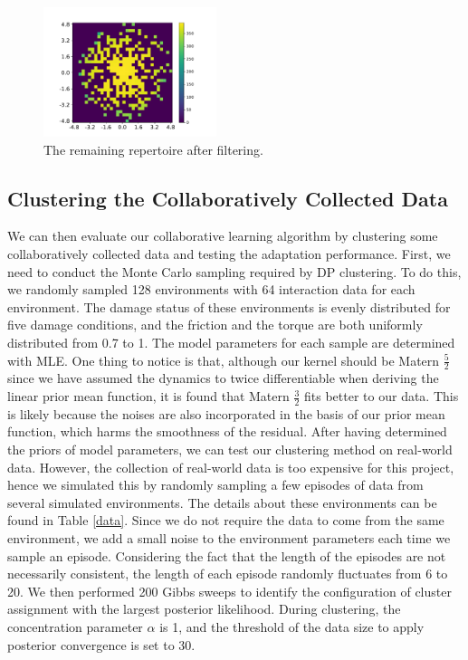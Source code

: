 \begin{figure}[h]
\centering
\includegraphics[width=0.45\textwidth]{filtered_map_elites.pdf}
\caption{The remaining repertoire after filtering.
}
\label{filtered_repertoire}
\end{figure}







\subsection{Clustering the Collaboratively Collected Data}
We can then evaluate our collaborative learning algorithm by clustering some collaboratively collected data and testing the adaptation performance. 
First, we need to conduct the Monte Carlo sampling required by DP clustering.
To do this, we randomly sampled 128 environments with 64 interaction data for each environment.
The damage status of these environments is evenly distributed for five damage conditions, and the friction and the torque are both uniformly distributed from 0.7 to 1.
The model parameters for each sample are determined with MLE.
One thing to notice is that, although our kernel should be Matern $\frac{5}{2}$ since we have assumed the dynamics to twice differentiable when deriving the linear prior mean function, it is found that Matern $\frac{3}{2}$ fits better to our data.
This is likely because the noises are also incorporated in the basis of our prior mean function, which harms the smoothness of the residual.
After having determined the priors of model parameters, we can test our clustering method on real-world data.
However, the collection of real-world data is too expensive for this project, hence we simulated this by randomly sampling a few episodes of data from several simulated environments.
The details about these environments can be found in Table \ref{data}.
Since we do not require the data to come from the same environment, we add a small noise to the environment parameters each time we sample an episode.
Considering the fact that the length of the episodes are not necessarily consistent, the length of each episode randomly fluctuates from 6 to 20.
We then performed 200 Gibbs sweeps to identify the configuration of cluster assignment with the largest posterior likelihood.
During clustering, the concentration parameter $\alpha$ is 1, and the threshold of the data size to apply posterior convergence is set to 30.


